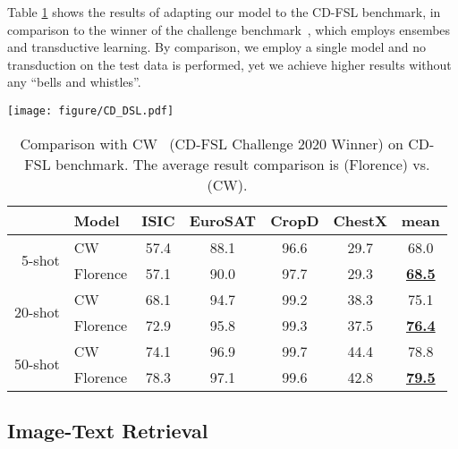 \documentclass{article}
\begin{document}
Table \ref{tab:cdfsl} shows the results of adapting our model to the CD-FSL benchmark, in comparison to the winner of the challenge benchmark~\cite{cdfsltop}, which employs ensembes and transductive learning. By comparison, we employ a single model and no transduction on the test data is performed, yet we achieve higher results without any ``bells and whistles''.

\begin{table}[t]
\centering
\begin{minipage}[t]{1.0\linewidth}
  \centering
\texttt{[image: figure/CD\_DSL.pdf]}
\end{minipage}\vspace{0.3em}
\setlength{\tabcolsep}{3.8pt}
\small
\renewcommand{\arraystretch}{1.35}
\begin{tabular}{r|l|cccc|c}
\toprule
 & Model & ISIC & EuroSAT & CropD & ChestX & mean \\ \midrule
\multirow{2}{*}{5-shot} & CW & 57.4 & 88.1 & 96.6 & 29.7 & 68.0 \\
 & Florence & 57.1 & 90.0 & 97.7 & 29.3 & \underline{\bf{68.5}} \\ \midrule
\multirow{2}{*}{20-shot} & CW & 68.1 & 94.7 & 99.2 & 38.3 & 75.1 \\
 & Florence & 72.9 & 95.8 & 99.3 & 37.5 & \underline{\bf{76.4}} \\ \midrule
\multirow{2}{*}{50-shot} & CW & 74.1 & 96.9 & 99.7 & 44.4 & 78.8 \\
 & Florence & 78.3 & 97.1 & 99.6 & 42.8 & \underline{\bf{79.5}} \\ \bottomrule
\end{tabular}
\caption{Comparison with CW~\cite{cdfsltop} (CD-FSL Challenge 2020 Winner) on CD-FSL benchmark. The average result comparison is  (Florence) vs.  (CW).}
\label{tab:cdfsl}
\end{table}


\subsection{Image-Text Retrieval}
\end{document}
